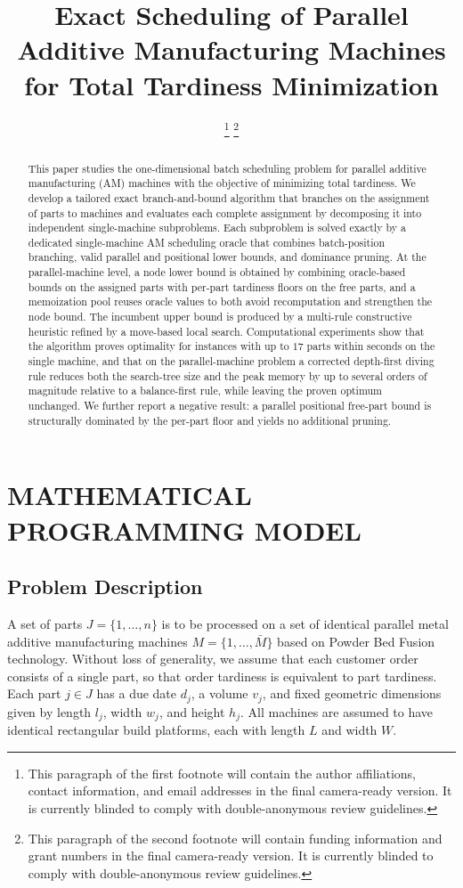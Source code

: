 \documentclass[letterpaper, 10 pt, conference]{ieeeconf}  %
\title{\LARGE \bf
Exact Scheduling of Parallel Additive Manufacturing Machines for Total Tardiness Minimization
}
\author{%
\thanks{This paragraph of the first footnote will contain the author affiliations, contact information, and email addresses in the final camera-ready version. It is currently blinded to comply with double-anonymous review guidelines.}
\thanks{This paragraph of the second footnote will contain funding information and grant numbers in the final camera-ready version. It is currently blinded to comply with double-anonymous review guidelines.}
}
\begin{document}
\maketitle
\thispagestyle{empty}
\pagestyle{empty}

\begin{abstract}
This paper studies the one-dimensional batch scheduling problem for parallel
additive manufacturing (AM) machines with the objective of minimizing total
tardiness. We develop a tailored exact branch-and-bound algorithm that branches
on the assignment of parts to machines and evaluates each complete assignment by
decomposing it into independent single-machine subproblems. Each subproblem is
solved exactly by a dedicated single-machine AM scheduling oracle that combines
batch-position branching, valid parallel and positional lower bounds, and
dominance pruning. At the parallel-machine level, a node lower bound is obtained
by combining oracle-based bounds on the assigned parts with per-part tardiness
floors on the free parts, and a memoization pool reuses oracle values to both
avoid recomputation and strengthen the node bound. The incumbent upper bound is
produced by a multi-rule constructive heuristic refined by a move-based local
search. Computational experiments show that the algorithm proves optimality for
instances with up to $17$ parts within seconds on the single machine, and that
on the parallel-machine problem a corrected depth-first diving rule reduces both
the search-tree size and the peak memory by up to several orders of magnitude
relative to a balance-first rule, while leaving the proven optimum unchanged. We further report a negative
result: a parallel positional free-part bound is structurally dominated by the
per-part floor and yields no additional pruning.
\end{abstract}



\section{MATHEMATICAL PROGRAMMING MODEL}

\subsection{Problem Description}
A set of parts $J=\{1,\dots,n\}$ is to be processed on a set of identical
parallel metal additive manufacturing machines $M=\{1,\dots,\bar M\}$
based on Powder Bed Fusion technology. Without loss of generality, we assume
that each customer order consists of a single part, so that order tardiness
is equivalent to part tardiness. Each part $j \in J$ has a due date $d_j$, a
volume $v_j$, and fixed geometric dimensions given by length $l_j$, width
$w_j$, and height $h_j$. All machines are assumed to have identical
rectangular build platforms, each with length $L$ and width $W$.
\end{document}
